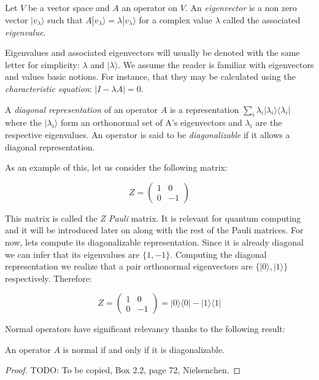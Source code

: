\begin{definition}
	Let $V$ be a vector space and $A$ an operator on $V$. An \emph{eigenvector} is a non zero vector $|v_\lambda\rangle$ such that $A|v_\lambda\rangle = \lambda|v_\lambda\rangle$ for a complex value $\lambda$ called the associated \emph{eigenvalue}.
\end{definition}

Eigenvalues and associated eigenvectors will usually be denoted with the same letter for simplicity: $\lambda$ and $|\lambda\rangle$. We assume the reader is familiar with eigenvectors and values basic notions. For instance, that they may be calculated using the \emph{characteristic equation}: $|I - \lambda A| = 0$.

\begin{definition}
	A \emph{diagonal representation} of an operator $A$ is a representation $\sum_i \lambda_i |\lambda_i\rangle\langle\lambda_i|$ where the $|\lambda_i\rangle$ form an orthonormal set of A's eigenvectors and $\lambda_i$ are the respective eigenvalues. An operator is said to be \emph{diagonalizable} if it allows a diagonal representation.
\end{definition}

\begin{exampleth}
	As an example of this, let us consider the following matrix:
	
	$$ Z = 
	\begin{pmatrix}
		1 & 0 \\
		0 & -1 
	\end{pmatrix}
	$$
	
	This matrix is called the \emph{Z Pauli} matrix. It is relevant for quantum computing and it will be introduced later on along with the rest of the Pauli matrices. For now, lets compute its diagonalizable representation. Since it is already diagonal we can infer that its eigenvalues are $\{1, -1\}$. Computing the diagonal representation we realize that a pair orthonormal eigenvectors are $\{|0\rangle, |1\rangle\}$ respectively. Therefore:
	
	$$ Z = 
	\begin{pmatrix}
		1 & 0 \\
		0 & -1 
	\end{pmatrix} = 
	|0\rangle\langle0| - |1\rangle\langle1|
	$$
\end{exampleth}

Normal operators have significant relevancy thanks to the following result:

\begin{theorem}
	An operator $A$ is normal if and only if it is diagonalizable.
\end{theorem}
\begin{proof}
	TODO: To be copied, Box 2.2, page 72, Nielsenchen.
\end{proof}


